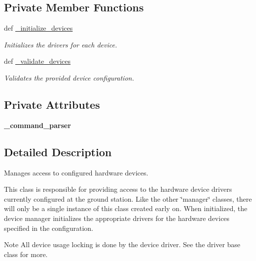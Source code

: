\subsection*{Private Member Functions}
\begin{DoxyCompactItemize}
\item 
def \hyperlink{classhwm_1_1hardware_1_1devices_1_1manager_1_1_device_manager_ab7d5bc119a003db751c563e6bbccb77e}{\-\_\-initialize\-\_\-devices}
\begin{DoxyCompactList}\small\item\em Initializes the drivers for each device. \end{DoxyCompactList}\item 
def \hyperlink{classhwm_1_1hardware_1_1devices_1_1manager_1_1_device_manager_a73e89933bfd030d34f9af2511fab87b3}{\-\_\-validate\-\_\-devices}
\begin{DoxyCompactList}\small\item\em Validates the provided device configuration. \end{DoxyCompactList}\end{DoxyCompactItemize}
\subsection*{Private Attributes}
\begin{DoxyCompactItemize}
\item 
\hypertarget{classhwm_1_1hardware_1_1devices_1_1manager_1_1_device_manager_ac1bf3a5b63d3e91e24e108e730bb9a62}{{\bfseries \-\_\-command\-\_\-parser}}\label{classhwm_1_1hardware_1_1devices_1_1manager_1_1_device_manager_ac1bf3a5b63d3e91e24e108e730bb9a62}

\end{DoxyCompactItemize}


\subsection{Detailed Description}
Manages access to configured hardware devices. 

This class is responsible for providing access to the hardware device drivers currently configured at the ground station. Like the other \char`\"{}manager\char`\"{} classes, there will only be a single instance of this class created early on. When initialized, the device manager initializes the appropriate drivers for the hardware devices specified in the configuration.

\begin{DoxyNote}{Note}
All device usage locking is done by the device driver. See the driver base class for more. 
\end{DoxyNote}


